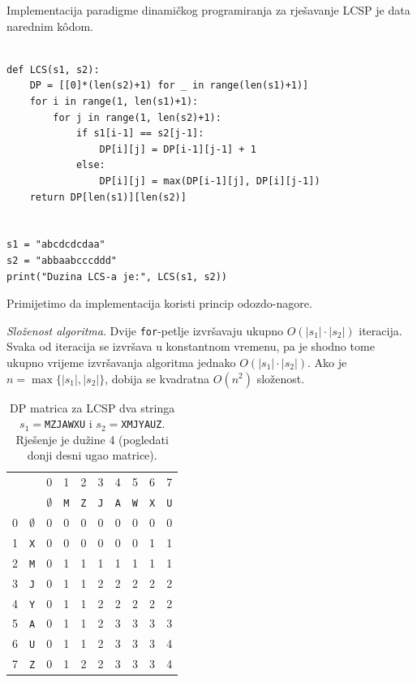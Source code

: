 	    
	 Implementacija paradigme dinamičkog programiranja za rješavanje LCSP je data narednim k\^odom. 
 \begin{verbatim}
	    	
def LCS(s1, s2):
    DP = [[0]*(len(s2)+1) for _ in range(len(s1)+1)]
    for i in range(1, len(s1)+1):
        for j in range(1, len(s2)+1):
            if s1[i-1] == s2[j-1]:
                DP[i][j] = DP[i-1][j-1] + 1
            else:
                DP[i][j] = max(DP[i-1][j], DP[i][j-1])
    return DP[len(s1)][len(s2)]


s1 = "abcdcdcdaa"
s2 = "abbaabcccddd"
print("Duzina LCS-a je:", LCS(s1, s2))
\end{verbatim}
	     Primijetimo da implementacija koristi princip odozdo-nagore.
	     
	     \textit{Složenost algoritma}. Dvije \texttt{for}-petlje  izvršavaju ukupno $O(|s_1|\cdot |s_2|)$ iteracija. Svaka od iteracija se izvršava u konstantnom vremenu, pa je shodno tome ukupno vrijeme izvršavanja algoritma jednako $O(|s_1| \cdot |s_2|)$. Ako je $n = \max\{|s_1|, |s_2|\}$, dobija se kvadratna $O(n^2)$ složenost. 
	     
     
     \begin{table}
     	  \centering
     	  \begin{tabular}{cc|cccccccc}
     	  	& & 0&1 &2 &3 &4 &5 &6 &7   \\
     	  
     	  	& & $\emptyset$&\texttt{M} &\texttt{Z} &\texttt{J} &\texttt{A} &\texttt{W} &\texttt{X} &\texttt{U}  \\ \hline \hline
     	  	
     	  	0&$\emptyset$ &0& 0& 0&  0&0 &0 & 0   & 0 	   \\
     	  	1& \texttt{X}& 0& 0& 0& 0& 0& 0&  1  & 1                \\	
     	  	2& \texttt{M}& 0& 1& 1& 1& 1& 1&  1  & 1                \\	
     	  	3& \texttt{J}& 0& 1& 1& 2& 2& 2&  2  & 2                \\	
     	  	4& \texttt{Y}&0 & 1& 1& 2& 2& 2&  2  & 2                 \\	
      	  	5& \texttt{A}& 0& 1& 1& 2& 3& 3&  3  & 3                \\	
      	  	6& \texttt{U}& 0& 1& 1& 2& 3& 3&  3  & 4                \\	
      	  	7& \texttt{Z}& 0& 1& 2& 2& 3& 3&  3  & 4                \\	 \hline \hline
     	  \end{tabular}
 	 \caption{DP matrica za LCSP dva stringa $s_1=$\texttt{MZJAWXU} i $s_2=$\texttt{XMJYAUZ}. Rješenje je dužine 4 (pogledati donji desni ugao matrice). }  \label{tab:dp-lcs-example} 
 	\end{table}


